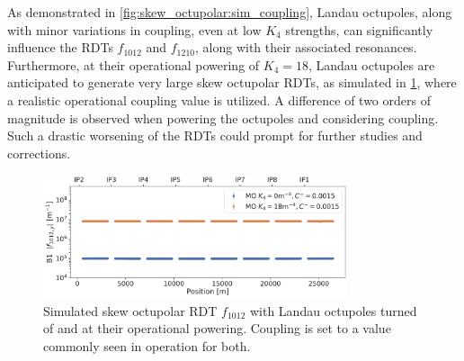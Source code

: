 
As demonstrated in \cref{fig:skew_octupolar:sim_coupling}, Landau octupoles, along with minor
variations in coupling, even at low $K_4$ strengths, can significantly influence the RDTs
$f_{1012}$ and $f_{1210}$, along with their associated resonances. Furthermore, at their
operational powering of $K_4=18$, Landau octupoles are anticipated to generate very large skew
octupolar RDTs, as simulated in \cref{fig:skew_octupolar:mo_full_power_coupling_simulation}, where a
realistic operational coupling value is utilized. A difference of two orders of magnitude is
observed when powering the octupoles and considering coupling.
Such a drastic worsening of the RDTs could prompt for further studies and corrections.

\begin{figure}[!htb]
    \centering
    \includegraphics[width=0.8\textwidth]{./images/skew_octupoles/f1012_AMP_full_mo_with_coupling.pdf}
    \caption{Simulated skew octupolar RDT $f_{1012}$ with Landau octupoles turned of and at their
    operational powering. Coupling is set to a value commonly seen in operation for both.}
    \label{fig:skew_octupolar:mo_full_power_coupling_simulation}
\end{figure}


